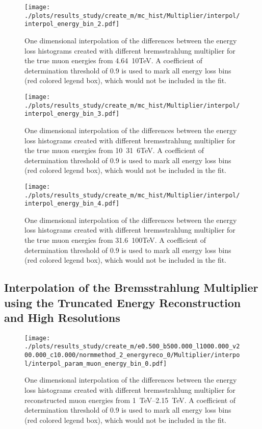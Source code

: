 \begin{figure}[H]
    \centering
    \texttt{[image: ./plots/results\_study/create\_m/mc\_hist/Multiplier/interpol/interpol\_energy\_bin\_2.pdf]}
    \caption{One dimensional interpolation of the differences between the energy loss histograms created with different bremsstrahlung multiplier for the true muon energies from \SI{4.64}{10}{TeV}. A coefficient of determination threshold of \num{0.9} is used to mark all energy loss bins (red colored legend box), which would not be included in the fit.}
    \label{fig:study_1d_interpol_mu2_mc}
\end{figure}

\begin{figure}[H]
    \centering
    \texttt{[image: ./plots/results\_study/create\_m/mc\_hist/Multiplier/interpol/interpol\_energy\_bin\_3.pdf]}
    \caption{One dimensional interpolation of the differences between the energy loss histograms created with different bremsstrahlung multiplier for the true muon energies from \SI{10}{31.6}{TeV}. A coefficient of determination threshold of \num{0.9} is used to mark all energy loss bins (red colored legend box), which would not be included in the fit.}
    \label{fig:study_1d_interpol_mu3_mc}
\end{figure}

\begin{figure}[H]
    \centering
    \texttt{[image: ./plots/results\_study/create\_m/mc\_hist/Multiplier/interpol/interpol\_energy\_bin\_4.pdf]}
    \caption{One dimensional interpolation of the differences between the energy loss histograms created with different bremsstrahlung multiplier for the true muon energies from \SI{31.6}{100}{TeV}. A coefficient of determination threshold of \num{0.9} is used to mark all energy loss bins (red colored legend box), which would not be included in the fit.}
    \label{fig:study_1d_interpol_mu4_mc}
\end{figure}

%

\subsection*{Interpolation of the Bremsstrahlung Multiplier using the Truncated Energy Reconstruction and High Resolutions}

\begin{figure}[H]
    \centering
    \texttt{[image: ./plots/results\_study/create\_m/e0.500\_b500.000\_l1000.000\_v200.000\_c10.000/normmethod\_2\_energyreco\_0/Multiplier/interpol/interpol\_param\_muon\_energy\_bin\_0.pdf]}
    \caption{One dimensional interpolation of the differences between the energy loss histograms created with different bremsstrahlung multiplier for reconstructed muon energies from \SIrange{1}{2.15}{TeV}. A coefficient of determination threshold of \num{0.9} is used to mark all energy loss bins (red colored legend box), which would not be included in the fit.}
    \label{fig:study_1d_interpol_mu0_te_high}
\end{figure}

